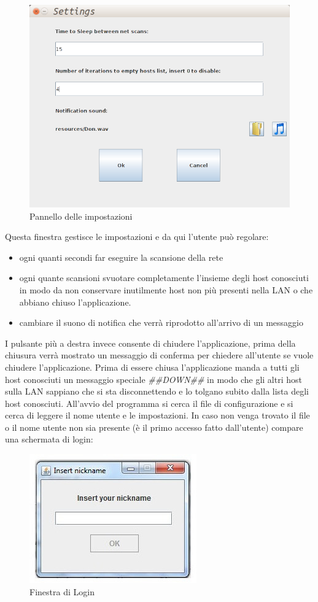 \begin{figure}[t]
\centering
\includegraphics[scale=0.3]{settings.png}
\caption{Pannello delle impostazioni\label{fig:settings}}
\end{figure}
Questa finestra gestisce le impostazioni e da qui l'utente può regolare:
\begin{itemize}
	\item ogni quanti secondi far eseguire la scansione della rete
	\item ogni quante scansioni svuotare completamente l'insieme degli host conosciuti 
	in modo da non conservare inutilmente host non più presenti nella LAN o che abbiano
	chiuso l'applicazione.
	\item cambiare il suono di notifica che verrà riprodotto all'arrivo di un messaggio	
\end{itemize}
I pulsante più a destra invece consente di chiudere l'applicazione, prima della
chiusura verrà mostrato un messaggio di conferma per chiedere all'utente se vuole chiudere
l'applicazione. Prima di essere chiusa l'applicazione manda a tutti gli host conosciuti
un messaggio speciale \emph{\#\#DOWN\#\#} in modo che gli altri host sulla LAN sappiano che si
sta disconnettendo e lo tolgano subito dalla lista degli host conosciuti.
All'avvio del programma si cerca il file di configurazione e si cerca di
leggere il nome utente e le impostazioni. In caso non venga trovato il file o il nome utente
non sia presente (è il primo accesso fatto dall'utente) compare una schermata di login:
\begin{figure}[h]
\centering
\includegraphics[scale=0.5]{login1.jpg}
\caption{Finestra di Login\label{fig:login}}
\end{figure}

